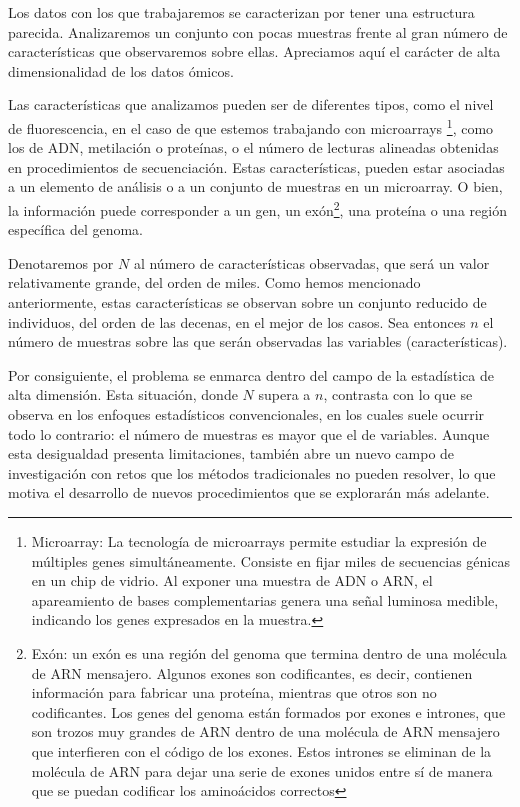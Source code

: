 Los datos con los que trabajaremos se caracterizan por tener una estructura parecida. Analizaremos un
conjunto con pocas muestras frente al gran número de características que observaremos sobre ellas. Apreciamos
aquí el carácter de alta dimensionalidad de los datos ómicos. \newline

Las características que analizamos pueden ser de diferentes tipos, como el nivel de fluorescencia, en el caso
de que estemos trabajando con microarrays \footnote[1]{Microarray: La tecnología de microarrays permite estudiar 
la expresión de múltiples genes simultáneamente. Consiste en fijar miles de secuencias génicas en un chip de vidrio. 
Al exponer una muestra de ADN o ARN, el apareamiento de bases complementarias genera una señal luminosa medible, 
indicando los genes expresados en la muestra\cite{microarray-definition}.}, como los de ADN, metilación o proteínas, o el número de lecturas 
alineadas obtenidas en procedimientos de secuenciación. Estas características, pueden estar asociadas a un
elemento de análisis o a un conjunto de muestras en un microarray. O bien, la información puede corresponder a
un gen, un exón\footnote[2]{Exón: un exón es una región del genoma que termina dentro de una molécula de ARN mensajero.
Algunos exones son codificantes, es decir, contienen información para fabricar una proteína, mientras que otros 
son no codificantes. Los genes del genoma están formados por exones e intrones, que son trozos muy grandes de ARN 
dentro de una molécula de ARN mensajero que interfieren con el código de los exones. 
Estos intrones se eliminan de la molécula de ARN para dejar una serie de exones unidos entre sí de manera que se 
puedan codificar los aminoácidos correctos\cite{exon-definition}\cite{intron-definition}}, una proteína o una región específica del genoma. \newline

Denotaremos por $N$ al número de características observadas, que será un valor relativamente grande, del orden
de miles. Como hemos mencionado anteriormente, estas características se observan sobre un conjunto reducido de 
individuos, del orden de las decenas, en el mejor de los casos. Sea entonces $n$ el número de muestras sobre
las que serán observadas las variables (características). \newline

Por consiguiente, el problema se enmarca dentro del campo de la estadística de alta dimensión. Esta
situación, donde $N$ supera a $n$, contrasta con lo que se observa en los enfoques estadísticos convencionales,
en los cuales suele ocurrir todo lo contrario: el número de muestras es mayor que el de variables. Aunque esta
desigualdad presenta limitaciones, también abre un nuevo campo de investigación con retos que los métodos 
tradicionales no pueden resolver, lo que motiva el desarrollo de nuevos procedimientos que se explorarán más 
adelante. \newline

